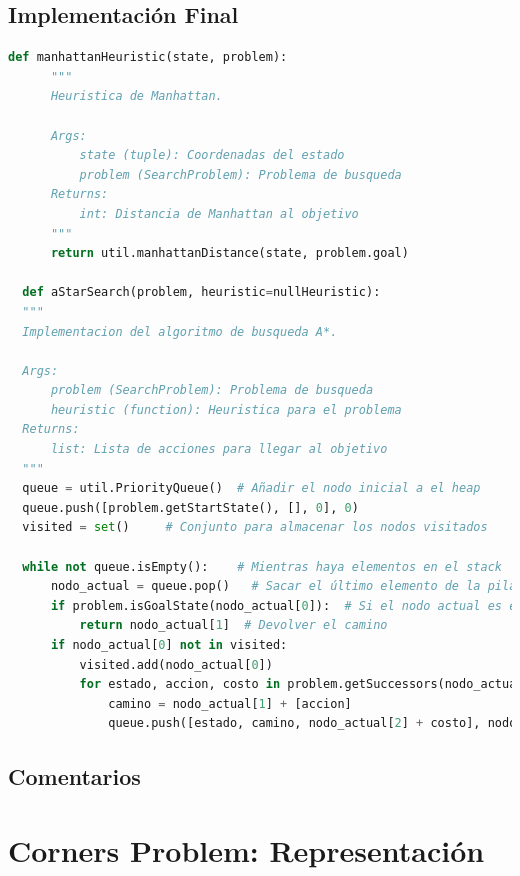 \documentclass{report}
\begin{document}
        \subsection*{Implementación Final}
          \begin{lstlisting}[language=Python, caption=Implementación final del A*]
  def manhattanHeuristic(state, problem):
      """
      Heuristica de Manhattan.
      
      Args:
          state (tuple): Coordenadas del estado
          problem (SearchProblem): Problema de busqueda
      Returns:
          int: Distancia de Manhattan al objetivo
      """
      return util.manhattanDistance(state, problem.goal)

  def aStarSearch(problem, heuristic=nullHeuristic):
  """
  Implementacion del algoritmo de busqueda A*.

  Args:
      problem (SearchProblem): Problema de busqueda
      heuristic (function): Heuristica para el problema
  Returns:
      list: Lista de acciones para llegar al objetivo
  """
  queue = util.PriorityQueue()  # Añadir el nodo inicial a el heap
  queue.push([problem.getStartState(), [], 0], 0)
  visited = set()     # Conjunto para almacenar los nodos visitados

  while not queue.isEmpty():    # Mientras haya elementos en el stack
      nodo_actual = queue.pop()   # Sacar el último elemento de la pila
      if problem.isGoalState(nodo_actual[0]):  # Si el nodo actual es el objetivo
          return nodo_actual[1]  # Devolver el camino
      if nodo_actual[0] not in visited:
          visited.add(nodo_actual[0])
          for estado, accion, costo in problem.getSuccessors(nodo_actual[0]): # Añadir los hijos del nodo actual a la pila
              camino = nodo_actual[1] + [accion]
              queue.push([estado, camino, nodo_actual[2] + costo], nodo_actual[2] + costo + heuristic(estado, problem))        
          \end{lstlisting}
        \subsection*{Comentarios}
          \paragraph*{}{
          }
      \clearpage\section{Corners Problem: Representación}
\end{document}
